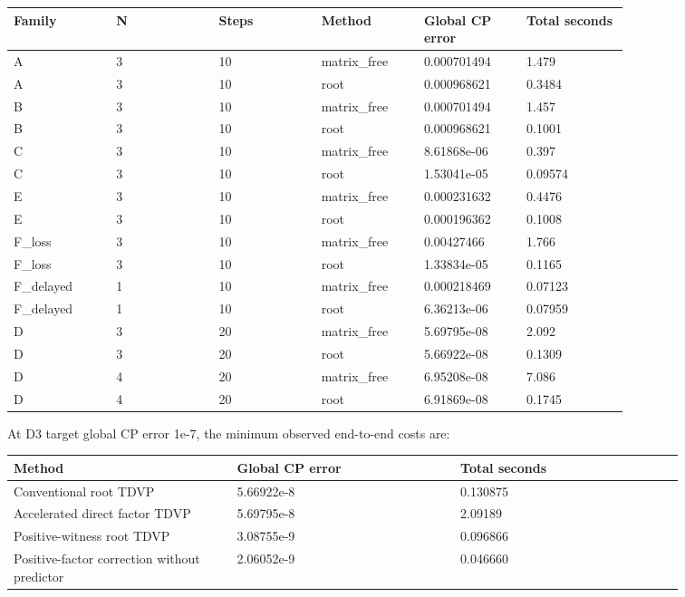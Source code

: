 \documentclass[10pt]{article}
\begin{document}
\begingroup\small\setlength{\tabcolsep}{3pt}\begin{longtable}{p{0.13166666666666665\linewidth}p{0.13166666666666665\linewidth}p{0.13166666666666665\linewidth}p{0.13166666666666665\linewidth}p{0.13166666666666665\linewidth}p{0.13166666666666665\linewidth}}\toprule
Family & N & Steps & Method & Global CP error & Total seconds \\
\midrule\endhead
A & 3 & 10 & matrix\_free & 0.000701494 & 1.479 \\
A & 3 & 10 & root & 0.000968621 & 0.3484 \\
B & 3 & 10 & matrix\_free & 0.000701494 & 1.457 \\
B & 3 & 10 & root & 0.000968621 & 0.1001 \\
C & 3 & 10 & matrix\_free & 8.61868e-06 & 0.397 \\
C & 3 & 10 & root & 1.53041e-05 & 0.09574 \\
E & 3 & 10 & matrix\_free & 0.000231632 & 0.4476 \\
E & 3 & 10 & root & 0.000196362 & 0.1008 \\
F\_loss & 3 & 10 & matrix\_free & 0.00427466 & 1.766 \\
F\_loss & 3 & 10 & root & 1.33834e-05 & 0.1165 \\
F\_delayed & 1 & 10 & matrix\_free & 0.000218469 & 0.07123 \\
F\_delayed & 1 & 10 & root & 6.36213e-06 & 0.07959 \\
D & 3 & 20 & matrix\_free & 5.69795e-08 & 2.092 \\
D & 3 & 20 & root & 5.66922e-08 & 0.1309 \\
D & 4 & 20 & matrix\_free & 6.95208e-08 & 7.086 \\
D & 4 & 20 & root & 6.91869e-08 & 0.1745 \\
\bottomrule\end{longtable}\endgroup

At D3 target global CP error 1e-7, the minimum observed end-to-end costs are:

\begingroup\small\setlength{\tabcolsep}{3pt}\begin{longtable}{p{0.28833333333333333\linewidth}p{0.28833333333333333\linewidth}p{0.28833333333333333\linewidth}}\toprule
Method & Global CP error & Total seconds \\
\midrule\endhead
Conventional root TDVP & 5.66922e-8 & 0.130875 \\
Accelerated direct factor TDVP & 5.69795e-8 & 2.09189 \\
Positive-witness root TDVP & 3.08755e-9 & 0.096866 \\
Positive-factor correction without predictor & 2.06052e-9 & 0.046660 \\
\bottomrule\end{longtable}\endgroup
\end{document}
